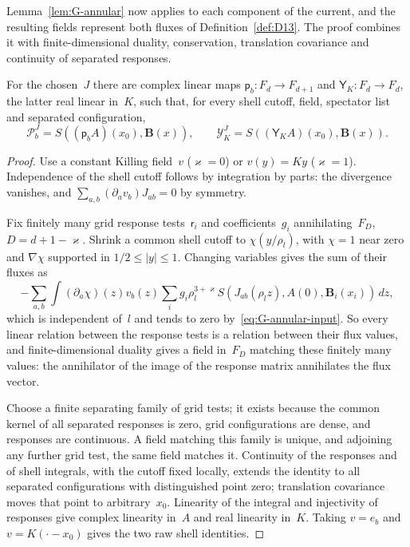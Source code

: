 Lemma~\ref{lem:G-annular} now applies to each component of the current, and the resulting fields represent both fluxes of Definition~\ref{def:D13}. The proof combines it with finite-dimensional duality, conservation, translation covariance and continuity of separated responses.
\begin{lemma}\label{lem:G2.3}
For the chosen~$J$ there are complex linear maps $\mathsf p_b:F_d\to F_{d+1}$ and $\mathsf Y_K:F_d\to F_d$, the latter real linear in~$K$, such that, for every shell cutoff, field, spectator list and separated configuration,
\begin{equation*}
\mathcal P_b^J=S((\mathsf p_bA)(x_0),\boldsymbol B(x)),\qquad
\mathcal Y_K^J=S((\mathsf Y_KA)(x_0),\boldsymbol B(x)).
\end{equation*}
\end{lemma}
\begin{proof}
Use a constant Killing field~$v$ ($\varkappa=0$) or $v(y)=Ky$ ($\varkappa=1$). Independence of the shell cutoff follows by integration by parts: the divergence vanishes, and $\sum_{a,b}(\partial_av_b)J_{ab}=0$ by symmetry.

Fix finitely many grid response tests~$\mathsf r_i$ and coefficients~$g_i$ annihilating~$F_D$, $D=d+1-\varkappa$. Shrink a common shell cutoff to $\chi(y/\rho_l)$, with $\chi=1$ near zero and $\nabla\chi$ supported in $1/2\le|y|\le1$. Changing variables gives the sum of their fluxes as
\begin{equation*}
-\sum_{a,b}\int(\partial_a\chi)(z)v_b(z)
 \sum_i g_i\rho_l^{3+\varkappa}
 S(J_{ab}(\rho_lz),A(0),\boldsymbol B_i(x_i))\,dz,
\end{equation*}
which is independent of~$l$ and tends to zero by~\eqref{eq:G-annular-input}. So every linear relation between the response tests is a relation between their flux values, and finite-dimensional duality gives a field in~$F_D$ matching these finitely many values: the annihilator of the image of the response matrix annihilates the flux vector.

Choose a finite separating family of grid tests; it exists because the common kernel of all separated responses is zero, grid configurations are dense, and responses are continuous. A field matching this family is unique, and adjoining any further grid test, the same field matches it. Continuity of the responses and of shell integrals, with the cutoff fixed locally, extends the identity to all separated configurations with distinguished point zero; translation covariance moves that point to arbitrary~$x_0$. Linearity of the integral and injectivity of responses give complex linearity in~$A$ and real linearity in~$K$. Taking $v=e_b$ and $v=K(\cdot-x_0)$ gives the two raw shell identities.
\end{proof}

